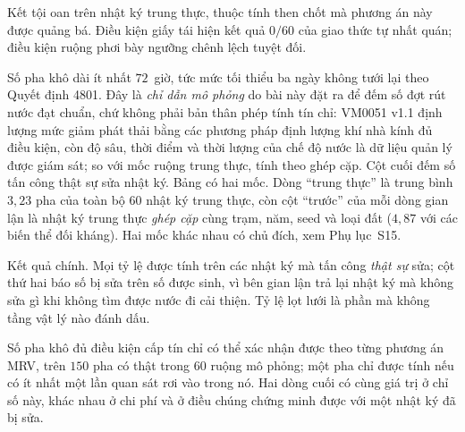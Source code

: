 



\begin{table}[!t]
\centering
\caption{Kết tội oan trên nhật ký trung thực, thuộc tính then chốt mà phương án này
được quảng bá. Điều kiện giấy tái hiện kết quả $0/60$ của giao thức tự nhất quán;
điều kiện ruộng phơi bày ngưỡng chênh lệch tuyệt đối.}
\label{tab:falseacc}
\footnotesize

\end{table}

\begin{table}[!t]
\centering
\caption{Số pha khô dài ít nhất $72$~giờ, tức mức tối thiểu ba ngày không tưới lại theo Quyết định 4801. Đây là \emph{chỉ dẫn mô phỏng} do bài này đặt ra để đếm số đợt rút nước đạt chuẩn, chứ không phải bản thân phép tính tín chỉ: VM0051 v1.1 định lượng mức giảm phát thải bằng các phương pháp định lượng khí nhà kính đủ điều kiện, còn độ sâu, thời điểm và thời lượng của chế độ nước là dữ liệu quản lý được giám sát; so với mốc ruộng trung thực, tính theo ghép cặp. Cột cuối đếm số tấn công thật sự sửa nhật ký. Bảng có hai mốc. Dòng ``trung
thực'' là trung bình $3{,}23$ pha của toàn bộ $60$ nhật ký trung thực, còn cột
``trước'' của mỗi dòng gian lận là nhật ký trung thực \emph{ghép cặp} cùng trạm,
năm, seed và loại đất ($4{,}87$ với các biến thể đối kháng). Hai mốc khác nhau
có chủ đích, xem Phụ lục~S15.}
\label{tab:credit}
\footnotesize

\end{table}

\begin{table}[!t]
\centering
\caption{Kết quả chính. Mọi tỷ lệ được tính trên các nhật ký mà tấn công
\emph{thật sự} sửa; cột thứ hai báo số bị sửa trên số được sinh, vì bên gian lận trả lại nhật ký mà không sửa gì khi không tìm được nước đi cải thiện. Tỷ lệ lọt lưới là
phần mà không tầng vật lý nào đánh dấu.}
\label{tab:defence}
\footnotesize

\end{table}

\begin{table}[!t]
\centering
\caption{Số pha khô đủ điều kiện cấp tín chỉ có thể xác nhận được theo từng
phương án MRV, trên $150$ pha có thật trong $60$ ruộng mô phỏng; một pha chỉ
được tính nếu có ít nhất một lần quan sát rơi vào trong nó. Hai dòng cuối có cùng giá trị ở chỉ số này, khác nhau ở chi phí và ở điều chúng chứng
minh được với một nhật ký đã bị sửa.}
\label{tab:benchmark}
\footnotesize

\end{table}

